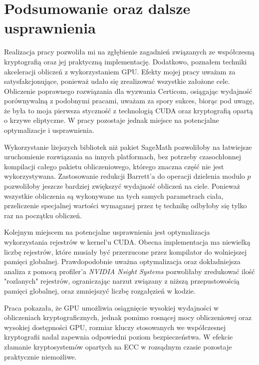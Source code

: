 \newpage
\section{Podsumowanie oraz dalsze usprawnienia}

Realizacja pracy pozwoliła mi na zgłębienie zagadnień związanych ze
współczesną kryptografią oraz jej praktyczną implementację. Dodatkowo,
poznałem techniki akceleracji obliczeń z wykorzystaniem GPU. Efekty mojej pracy
uważam za satysfakcjonujące, ponieważ udało się zrealizować wszystkie
założone cele. Obliczenie poprawnego rozwiązania dla wyzwania Certicom,
osiągając wydajność porównywalną z podobnymi pracami, uważam za spory sukces,
biorąc pod uwagę, że była to moja pierwsza styczność z technologią CUDA oraz
kryptografią opartą o krzywe eliptyczne. W pracy pozostaje jednak miejsce na
potencjalne optymalizacje i usprawnienia.

Wykorzystanie lżejszych bibliotek niż pakiet SageMath pozwoliłoby na
łatwiejsze uruchomienie rozwiązania na innych platformach, bez potrzeby
czasochłonnej kompilacji całego pakietu obliczeniowego, którego znaczna
część nie jest wykorzystywana.
Zastosowanie redukcji Barrett'a do operacji dzielenia modulo $p$ pozwoliłoby
jeszcze bardziej zwiększyć wydajność obliczeń na ciele. Ponieważ wszystkie
obliczenia są wykonywane na tych samych parametrach ciała, przeliczenie
specjalnej wartości wymaganej przez tę technikę odbyłoby się tylko raz na
początku obliczeń.

Kolejnym miejscem na potencjalne usprawnienia jest optymalizacja wykorzystania 
rejestrów w kernel'u CUDA. Obecna implementacja ma niewielką liczbę rejestrów,
które musiały być przerzucone przez kompilator do wolniejszej pamięci
globalnej. Prawdopodobnie uważna optymalizacja oraz dokładniejsza analiza z
pomocą profiler'a \textit{NVIDIA Nsight Systems} pozwoliłaby zredukować ilość
"rozlanych" rejestrów, ograniczając narzut związany z niższą
przepustowością pamięci globalnej, oraz zmniejszyć liczbę rozgałęzień w kodzie.

Praca pokazała, że GPU umożliwia osiągnięcie wysokiej wydajności w obliczeniach
kryptograficznych, jednak pomimo rosnącej mocy obliczeniowej oraz wysokiej dostępności
GPU, rozmiar kluczy stosowanych we współczesnej kryptografii nadal zapewnia
odpowiedni poziom bezpieczeństwa. W efekcie złamanie kryptosystemów opartych na
ECC w rozsądnym czasie pozostaje praktycznie niemożliwe.